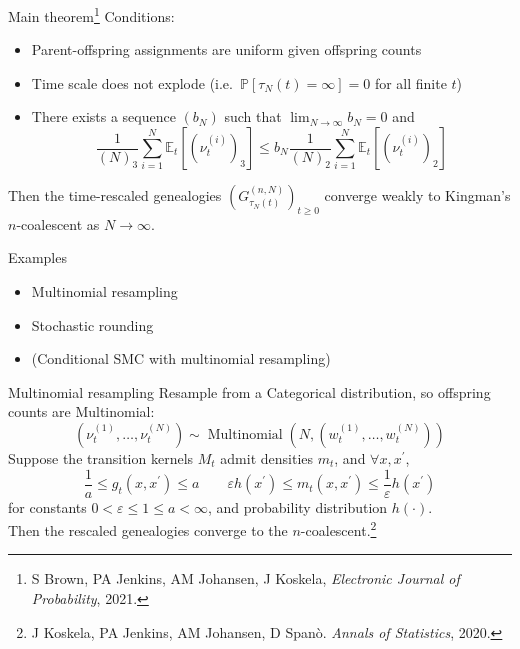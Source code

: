 \documentclass[aspectratio=169]{beamer}
\theoremstyle{definition}
\newcommand{\PR}{\mathbb{P}}
\newcommand{\E}{\mathbb{E}}
\newcommand{\Mn}{\operatorname{Multinomial}}
\newcommand{\vt}[2][t]{\nu_{#1}^{(#2)}}
\newcommand{\wt}[2][t]{w_{#1}^{(#2)}}
\begin{document}
\begin{frame}{Main theorem\footnote{S Brown, PA Jenkins, AM Johansen, J Koskela,  \textit{Electronic Journal of Probability}, 2021.}}
Conditions:
\begin{itemize}
\item Parent-offspring assignments are uniform given offspring counts
\item Time scale does not explode (i.e.\ $\PR[\tau_N(t)=\infty]=0$ for all finite $t$)
\item There exists a sequence $(b_N)$ such that $\lim_{N\to\infty} b_N = 0$ and
\begin{equation*}
\frac{1}{(N)_3} \sum_{i=1}^N \E_t [ (\vt{i})_3 ]
\leq b_N \frac{1}{(N)_2} \sum_{i=1}^N \E_t [ (\vt{i})_2 ]
\end{equation*}
\end{itemize}
Then the time-rescaled genealogies $\left( G_{\tau_N(t)}^{(n,N)} \right)_{t\geq0}$ converge weakly to Kingman's $n$-coalescent as $N\to\infty$.
\end{frame}


\begin{frame}{Examples}
\begin{itemize}
\item Multinomial resampling
\item Stochastic rounding 
\item (Conditional SMC with multinomial resampling)
\end{itemize}
\end{frame}


\begin{frame}{Multinomial resampling}
Resample from a Categorical distribution, so offspring counts are Multinomial:
\begin{equation*}
(\vt{1} , \dots, \vt{N}) \sim \Mn \left( N, (\wt{1},\dots,\wt{N}) \right)
\end{equation*}
Suppose the transition kernels $M_t$ admit densities $m_t$, and $\forall x, x^\prime$,
\begin{equation*}
\frac{1}{a} \leq g_t(x, x^\prime) \leq a \qquad
\varepsilon h(x^\prime) \leq m_t(x, x^\prime) \leq \frac{1}{\varepsilon} h(x^\prime) 
\end{equation*}
for constants $0<\varepsilon\leq 1\leq a<\infty$, and probability distribution $h(\cdot)$.\\[10pt]
Then the rescaled genealogies converge to the $n$-coalescent.\footnote{J Koskela, PA Jenkins, AM Johansen, D Span\`o. \textit{Annals of Statistics}, 2020.}
\end{frame}
\end{document}
